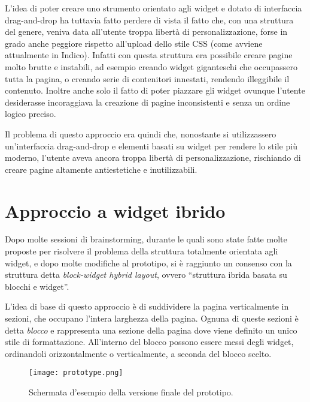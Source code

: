        	L'idea di poter creare uno strumento orientato agli widget e dotato di interfaccia drag-and-drop ha tuttavia fatto perdere di vista il fatto che, con una struttura del genere, veniva data all'utente troppa libertà di personalizzazione, forse in grado anche peggiore rispetto all'upload dello stile \ac{CSS} (come avviene attualmente in Indico). Infatti con questa struttura era possibile creare pagine molto brutte e instabili, ad esempio creando widget giganteschi che occupassero tutta la pagina, o creando serie di contenitori innestati, rendendo illeggibile il contenuto. Inoltre anche solo il fatto di poter piazzare gli widget ovunque l'utente desiderasse incoraggiava la creazione di pagine inconsistenti e senza un ordine logico preciso.
       	
       	Il problema di questo approccio era quindi che, nonostante si utilizzassero un'interfaccia drag-and-drop e elementi basati su widget per rendere lo stile più moderno, l'utente aveva ancora troppa libertà di personalizzazione, rischiando di creare pagine altamente antiestetiche e inutilizzabili.
    
    \section{Approccio a widget ibrido} \label{sec:ccp;approccio_widget_ibrido}
    
        Dopo molte sessioni di brainstorming, durante le quali sono state fatte molte proposte per risolvere il problema della struttura totalmente orientata agli widget, e dopo molte modifiche al prototipo, si è raggiunto un consenso con la struttura detta \textit{block-widget hybrid layout}, ovvero ``struttura ibrida basata su blocchi e widget''.
        
        L'idea di base di questo approccio è di suddividere la pagina verticalmente in sezioni, che occupano l'intera larghezza della pagina. Ognuna di queste sezioni è detta \textit{blocco} e rappresenta una sezione della pagina dove viene definito un unico stile di formattazione. All'interno del blocco possono essere messi degli widget, ordinandoli orizzontalmente o verticalmente, a seconda del blocco scelto.
        
       	\begin{figure}[h!]
       		\begin{center}
       			\texttt{[image: prototype.png]}
       		\end{center}
       		\caption[Versione finale del prototipo]{Schermata d'esempio della versione finale del prototipo.}
       		\label{fig:prototype}
       	\end{figure}
       	
